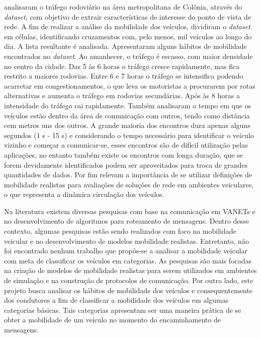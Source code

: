 \documentclass[mestrado, pre-defesa, english, brazil]{packages/icmc}
\begin{document}
 analisaram o tráfego rodoviário na área metropolitana de Colônia, através do \textit{dataset}\cite{tapas-2014}, com objetivo de extrair características de interesse do ponto de vista de rede. A fim de realizar a análise da mobilidade dos veículos, dividiram o \textit{dataset} em células, identificando cruzamentos com, pelo menos, mil veículos ao longo do dia. A lista resultante é analisada. Apresentaram alguns hábitos de mobilidade encontrados no \textit{dataset}. Ao amanhecer, o tráfego é escasso, com maior densidade no centro da cidade. Das 5 às 6 horas o tráfego cresce rapidamente, mas fica restrito a maiores rodovias. Entre 6 e 7 horas o tráfego se intensifica podendo acarretar em congestionamentos, o que leva os motoristas a procurarem por rotas alternativas e aumenta o tráfego em rodovias secundárias. Após às 8 horas a intensidade do tráfego cai rapidamente. Também analisaram o tempo em que os veículos estão dentro da área de comunicação com outros, tendo como distância cem metros uns dos outros. A grande maioria dos encontros dura apenas alguns segundos (1 s - 15 s) e considerando o tempo necessário para identificar o veículo vizinho e começar a comunicar-se, esses encontros são de difícil utilização pelas aplicações, no entanto também existe os encontros com longa duração, que se forem devidamente identificados podem ser aproveitados para troca de grandes quantidades de dados. Por fim relevam a importância de se utilizar definições de mobilidade realistas para avaliações de soluções de rede em ambientes veiculares, o que representa a dinâmica circulação dos veículos.


Na literatura existem diversas pesquisas com base na comunicação em VANETs e no desenvolvimento de algoritmos para roteamento de mensagens. Dentro desse contexto, algumas pesquisas estão sendo realizados com foco na mobilidade veicular e no desenvolvimento de modelos mobilidade realistas. Entretanto, não foi encontrado nenhum trabalho que propôs-se a analisar a mobilidade veicular com meta de classificar os veículos em categorias. As pesquisas são mais focadas na criação de modelos de mobilidade realistas para serem utilizados em ambientes de simulação e na construção de protocolos de comunicação. Por outro lado, este projeto busca analisar os hábitos de mobilidade dos veículos e consequentemente dos condutores a fim de classificar a mobilidade dos veículos em algumas categorias básicas. Tais categorias apresentam ser uma maneira prática de se obter a mobilidade de um veículo no momento do encaminhamento de mensagens.
\end{document}
